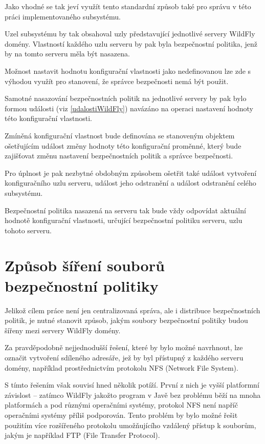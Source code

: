 Jako vhodné se tak jeví využít tento standardní způsob také pro správu v této práci implementovaného subsystému.

Uzel subsystému by tak obsahoval uzly představující jednotlivé servery WildFly domény.
Vlastností každého uzlu serveru by pak byla bezpečnostní politika, jenž by na tomto serveru měla být nasazena.

Možnost nastavit hodnotu konfigurační vlastnosti jako nedefinovanou lze zde s výhodou využít pro stanovení, že správce bezpečnosti nemá být použit.

Samotné nasazování bezpečnostních politik na jednotlivé servery by pak bylo formou události (viz \ref{udalostiWildFly})
navázáno na operaci nastavení hodnoty této konfigurační vlastnosti.

Zmíněná konfigurační vlastnost bude definována se stanoveným objektem ošetřujícím událost změny hodnoty této konfigurační proměnné, který bude zajišťovat
změnu nastavení bezpečnostních politik a správce bezpečnosti.

Pro úplnost je pak nezbytné obdobným způsobem ošetřit také událost vytvoření konfiguračního uzlu serveru, událost jeho odstranění a událost odstranění
celého subsystému.

Bezpečnostní politika nasazená na serveru tak bude vždy odpovídat aktuální hodnotě konfigurační vlastnosti, určující bezpečnostní politiku serveru, uzlu tohoto serveru.

\section{Způsob šíření souborů bezpečnostní politiky} \label{sireniSouboru}

Jelikož cílem práce není jen centralizovaná správa, ale i distribuce bezpečnostních politik, je nutné stanovit způsob, jakým soubory bezpečnostní politiky budou šířeny mezi servery WildFly domény.

Za pravděpodobně nejjednodušší řešení, které by bylo možné navrhnout, lze označit vytvoření sdíleného adresáře, jež by byl přístupný z každého serveru domény, například prostřednictvím protokolu NFS (Network File System).

S tímto řešením však souvisí hned několik potíží.
První z nich je vyšší platformní závislost -- zatímco WildFly jakožto program v Javě bez problému běží na mnoha platformách a pod různými operačními systémy, protokol NFS není napříč operačními systémy příliš podporován.
Tento problém by bylo možné řešit použitím více rozšířeného protokolu umožňujícího vzdálený přístup k souborům, jakým je například FTP (File Transfer Protocol).

